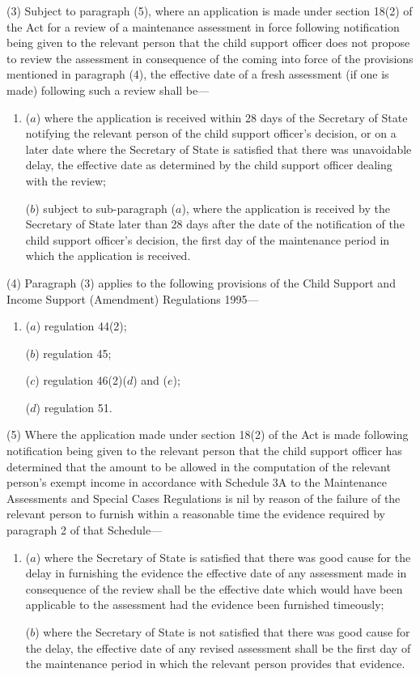 \documentclass[a4paper]{article}
\begin{document}
(3) Subject to paragraph (5), where an application is made under section 18(2) of the Act for a review of a maintenance assessment in force following notification being given to the relevant person that the child support officer does not propose to review the assessment in consequence of the coming into force of the provisions mentioned in paragraph (4), the effective date of a fresh assessment (if one is made) following such a review shall be—
\begin{enumerate}\item[]
($a$) where the application is received within 28 days of the Secretary of State notifying the relevant person of the child support officer’s decision, or on a later date where the Secretary of State is satisfied that there was unavoidable delay, the effective date as determined by the child support officer dealing with the review;

($b$) subject to sub-paragraph ($a$), where the application is received by the Secretary of State later than 28 days after the date of the notification of the child support officer’s decision, the first day of the maintenance period in which the application is received.
\end{enumerate}

(4) Paragraph (3) applies to the following provisions of the Child Support and Income Support (Amendment) Regulations 1995—
\begin{enumerate}\item[]
($a$) regulation 44(2);

($b$) regulation 45;

($c$) regulation 46(2)($d$) and ($e$);

($d$) regulation 51.
\end{enumerate}

(5) Where the application made under section 18(2) of the Act is made following notification being given to the relevant person that the child support officer has determined that the amount to be allowed in the computation of the relevant person’s exempt income in accordance with Schedule 3A to the Maintenance Assessments and Special Cases Regulations is nil by reason of the failure of the relevant person to furnish within a reasonable time the evidence required by paragraph 2 of that Schedule—
\begin{enumerate}\item[]
($a$) where the Secretary of State is satisfied that there was good cause for the delay in furnishing the evidence the effective date of any assessment made in consequence of the review shall be the effective date which would have been applicable to the assessment had the evidence been furnished timeously;

($b$) where the Secretary of State is not satisfied that there was good cause for the delay, the effective date of any revised assessment shall be the first day of the maintenance period in which the relevant person provides that evidence.
\end{enumerate}
\end{document}
